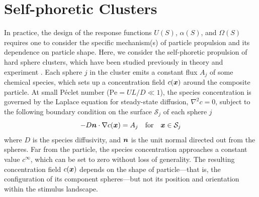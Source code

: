 \section{Self-phoretic Clusters}  
In practice, the design of the response functions $U(S)$, $\alpha(S)$, and $\Omega(S)$ requires one to consider the specific mechanism(s) of particle propulsion and its dependence on particle shape. Here, we consider the self-phoretic propulsion of hard sphere clusters, which have been studied previously in theory \autocite{soto2014self, varma2018clustering} and experiment \autocite{niu2018dynamics, schmidt2019light}. Each sphere $j$ in the cluster emits a constant flux $A_j$ of some chemical species, which sets up a concentration field $c(\boldsymbol{x})$ around the composite particle. At small P\'eclet number ($\text{Pe}=UL/D\ll1$), the species concentration is governed by the Laplace equation for steady-state diffusion, $\nabla^2c=0$, subject to the following boundary condition on the surface $\mathcal{S}_j$ of each sphere $j$
\begin{equation}
   -D\boldsymbol{n} \cdot \nabla c(\boldsymbol{x}) = A_j \quad \text{for} \quad \boldsymbol{x}\in \mathcal{S}_j
\end{equation}
where $D$ is the species diffusivity, and $\boldsymbol{n}$ is the unit normal directed out from the spheres.  Far from the particle, the species concentration approaches a constant value $c^{\infty}$, which can be set to zero without loss of generality. The resulting concentration field $c(\boldsymbol{x})$ depends on the shape of particle---that is, the configuration of its component spheres---but not its position and orientation within the stimulus landscape.

